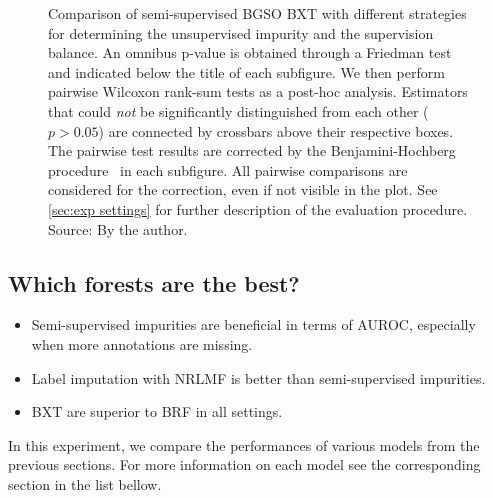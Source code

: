 \begin{figure}[tb]
    \caption{
        Comparison of semi-supervised BGSO BXT with different strategies for determining the unsupervised impurity and the supervision balance.
        An omnibus p-value is obtained through a Friedman test and indicated below the title of each subfigure.
        We then perform pairwise Wilcoxon rank-sum tests as a post-hoc analysis.
        Estimators that could \emph{not} be significantly distinguished from each other ($p > 0.05$) are connected by crossbars above their respective boxes. 
        The pairwise test results are corrected by the Benjamini-Hochberg procedure~\cite{benjamini1995controlling,haynes2013benjamini} in each subfigure. All pairwise comparisons are considered for the correction, even if not visible in the plot.
        See \autoref{sec:exp settings} for further description of the evaluation procedure. \newline Source: By the author.
    }
    \label{fig:ss_comparison}
\end{figure}


\subsection{Which forests are the best?}
\label{sec:best_forests}

\begin{mdframed}[frametitle={Key findings}]
    \begin{itemize}
        \item Semi-supervised impurities are beneficial in terms of AUROC, especially when more annotations are missing.  %
        \item Label imputation with NRLMF is better than semi-supervised impurities.
        \item BXT are superior to BRF in all settings.
    \end{itemize}
\end{mdframed}

In this experiment, we compare the performances of various models from the previous sections. For more information on each model see the corresponding section in the list bellow.

